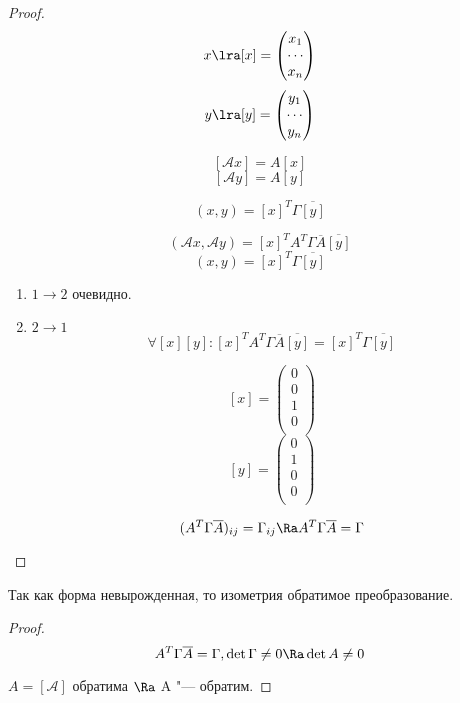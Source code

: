 \begin{proof}
$$x \lra [x] = \begin{pmatrix} x_1\\ \cdots\\ x_n\\ \end{pmatrix} $$
$$y \lra [y] = \begin{pmatrix} y_1\\ \cdots\\ y_n\\ \end{pmatrix} $$

$$[\mathscr{A}x] = A[x]$$
$$[\mathscr{A}y] = A[y]$$

$$(x, y) = [x]^T \Gamma \overline{[y]}$$

$$(\mathscr{A}x, \mathscr{A}y) = [x]^TA^T\Gamma \overline{A} \overline{[y]}$$
$$(x, y) = [x]^T\Gamma\overline{[y]}$$

\begin{enumerate}
\item $1 \to 2$ очевидно. 
\item $2 \to 1$
$$\forall [x][y] \colon [x]^TA^T\Gamma\overline{A}\overline{[y]} = [x]^{T} \Gamma \overline{[y]}$$

$$[x] = \begin{pmatrix} 0 \\ 0 \\ 1\\ 0 \\ \end{pmatrix}$$
$$[y] = \begin{pmatrix} 0\\ 1\\ 0\\ 0\\ \end{pmatrix}$$

$$(A^T \Gamma \overline{A})_{ij} = \Gamma_{ij} \Ra A^T \Gamma \overline{A} = \Gamma$$
\end{enumerate}
\end{proof}

\begin{conseq}
Так как форма невырожденная, то изометрия обратимое преобразование. 
\end{conseq}
\begin{proof}
$$A^{T}\Gamma \overline{A} = \Gamma, \det \Gamma \ne 0 \Ra \det A \ne 0$$

$A = [\mathscr{A}]$ обратима $\Ra$ A "--- обратим.  
\end{proof}

